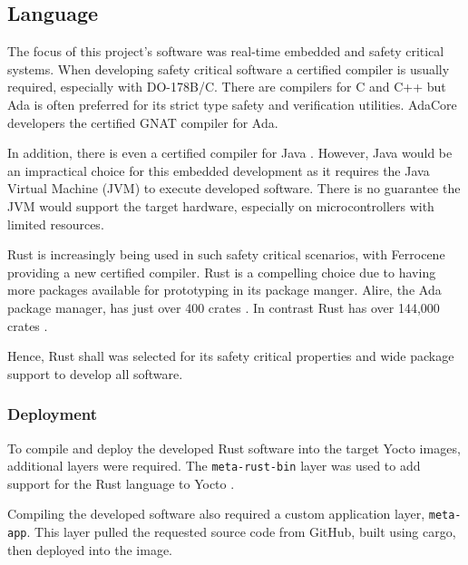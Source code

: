 \graphicspath{{main/design/software/graphics/}}

\subsection{Language}

The focus of this project's software was real-time embedded and safety critical systems. When developing safety critical software a certified compiler is usually required, especially with DO-178B/C. There are compilers for C and C++ but Ada is often preferred for its strict type safety and verification utilities. AdaCore developers the certified GNAT compiler for Ada.

In addition, there is even a certified compiler for Java \autocite{hentiesJavaSafetyCriticalApplications2009}. However, Java would be an impractical choice for this embedded development as it requires the Java Virtual Machine (JVM) to execute developed software. There is no guarantee the JVM would support the target hardware, especially on microcontrollers with limited resources.

Rust is increasingly being used in such safety critical scenarios, with Ferrocene providing a new certified compiler. Rust is a compelling choice due to having more packages available for prototyping in its package manger. Alire, the Ada package manager, has just over 400 crates \autocite{alireAlireCrates2024}. In contrast Rust has over 144,000 crates \autocite{lib.rsStateCratesEcosystem}.

Hence, Rust shall was selected for its safety critical properties and wide package support to develop all software.

\subsubsection{Deployment}

To compile and deploy the developed Rust software into the target Yocto images, additional layers were required. The \verb|meta-rust-bin| layer was used to add support for the Rust language to Yocto \autocite{rustembeddedRustembeddedMetarustbin2024}.

Compiling the developed software also required a custom application layer, \verb|meta-app|. This layer pulled the requested source code from GitHub, built using cargo, then deployed into the image.